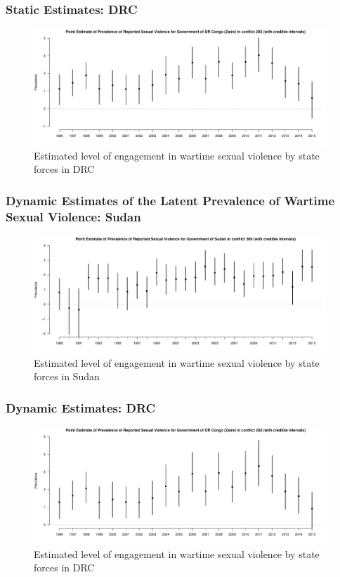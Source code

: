 \documentclass[xcolor=dvipsnames,12pt]{beamer} %
\begin{document}
\begin{frame}[label=DRC-static]
\frametitle{Static Estimates: DRC}
\begin{figure}\centering
\includegraphics[width=11cm]{../visualize/output/pp-static-estimates-DR-Congo-Zaire-283.pdf}
\caption{Estimated level of engagement in wartime sexual violence by state forces in DRC \hyperlink{DRC-obs}{}\hyperlink{DRC-dynamic}{}}
\end{figure}
\end{frame}



\begin{frame}[label=SUDAN-dynamic]
\frametitle{Dynamic Estimates of the Latent Prevalence of Wartime Sexual Violence: Sudan}
\begin{figure}\centering
\includegraphics[width=11cm]{../visualize/output/pp-dynamic-estimates-Sudan-309.pdf}
\caption{Estimated level of engagement in wartime sexual violence by state forces in Sudan \hyperlink{SUDAN-static}{}}
\end{figure}
\end{frame}


\begin{frame}[label=DRC-dynamic]
\frametitle{Dynamic Estimates: DRC}
\begin{figure}\centering
\includegraphics[width=11cm]{../visualize/output/pp-dynamic-estimates-DR-Congo-Zaire-283.pdf}
\caption{Estimated level of engagement in wartime sexual violence by state forces in DRC \hyperlink{DRC-static}{}}
\end{figure}
\end{frame}
\end{document}
